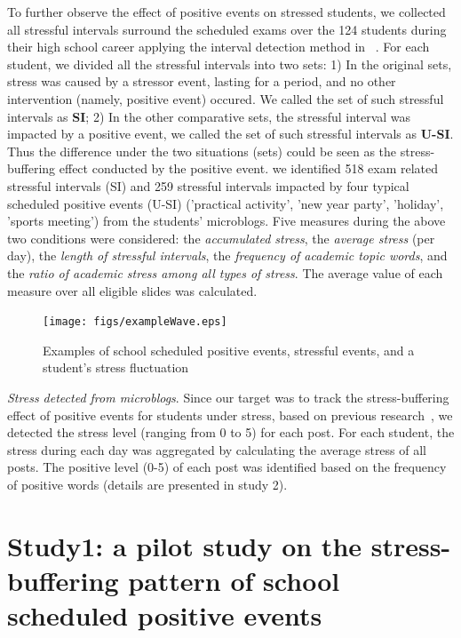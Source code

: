 To further observe the effect of positive events on stressed students,
we collected all stressful intervals surround the scheduled exams over the 124 students during their high school career
applying the interval detection method in ~\citep{Li2017Analyzing}.
For each student, we divided all the stressful intervals into two sets:
1) In the original sets, stress was caused by a stressor event, lasting for a period,
and no other intervention (namely, positive event) occured.
We called the set of such stressful intervals as \textbf{SI};
2) In the other comparative sets,
the stressful interval was impacted by a positive event,
we called the set of such stressful intervals as \textbf{U-SI}.
Thus the difference under the two situations (sets) could be seen as the stress-buffering effect
conducted by the positive event.
we identified 518 exam related stressful intervals (SI)
and 259 stressful intervals impacted by four typical scheduled positive events (U-SI)
('practical activity', 'new year party', 'holiday', 'sports meeting') from the students' microblogs.
Five measures during the above two conditions were considered:
the \emph{accumulated stress}, the \emph{average stress} (per day), the \emph{length of stressful intervals},
the \emph{frequency of academic topic words}, and the \emph{ratio of academic stress among all types of stress}.
The average value of each measure over all eligible slides was calculated.

\begin{figure}[H]
\centering
\texttt{[image: figs/exampleWave.eps]}
\caption{\small{Examples of school scheduled positive events, stressful events, and a student's stress fluctuation}}
\label{fig:example}
\end{figure}

\emph{Stress detected from microblogs}.
Since our target was to track the stress-buffering effect of positive events for students under stress,
based on previous research~\cite{XueUbicomp13},
we detected the stress level (ranging from 0 to 5) for each post.
For each student,
the stress during each day was aggregated by calculating the average stress of all posts.
The positive level (0-5) of each post was identified based on the frequency of positive words (details are presented in study 2).

\section{Study1: a pilot study on the stress-buffering pattern of school scheduled positive events}


